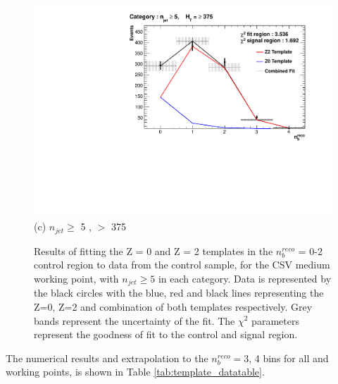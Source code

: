 \begin{figure}[ht]
\begin{minipage}[b]{0.51\linewidth}
\centering
\includegraphics[width = 1.0\linewidth]{plots/ThesisPlots/Final_Fit_To_Data_Normal_Medium_HTBin_OneMuon_Template_375_jet_mult_5.pdf}
\centering (c) $n_{jet} \geq$ 5 , \theht $>$ 375 
\end{minipage}
\caption[Results of fitting the Z = 0 and Z = 2 templates in the $n_{b}^{reco}$ = 0-2 control region to data from the \mupjets control sample, for the \ac{CSV} medium working point, with $n_{jet} \geq 5$ in each \theht category.]{Results of fitting the Z = 0 and Z = 2 templates in the $n_{b}^{reco}$ = 0-2 control region to data from the \mupjets control sample, for the \ac{CSV} medium working point, with $n_{jet} \geq 5$ in each \theht category. Data is represented by the black circles with the blue, red and black lines representing the Z=0, Z=2 and combination of both templates respectively. Grey bands represent the uncertainty of the fit. The $\chi^{2}$ parameters represent the goodness of fit to the control and signal region.}
\label{fig:template_data_med_njet5}
\end{figure}

The numerical results and extrapolation to the $n_{b}^{reco} =$3, 4 bins for all \theht and working points, is shown in Table \ref{tab:template_datatable}.

